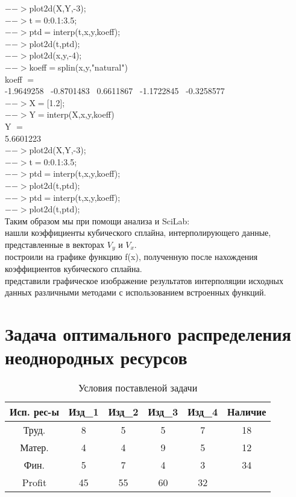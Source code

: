 \documentclass[russian,utf8,nocolumnxxxi,nocolumnxxxii]{eskdtext}
\begin{document}
$-->$plot2d(X,Y,-3);\\
$-->$t$=$0:0.1:3.5;\\
$-->$ptd$=$interp(t,x,y,koeff);\\
$-->$plot2d(t,ptd);\\
$-->$plot2d(x,y,-4);\\
$-->$koeff$=$splin(x,y,"natural")\\
koeff $=$\\
-1.9649258 \ -0.8701483 \ 0.6611867 \ -1.1722845 \ -0.3258577 \\
$-->$X$=$[1.2];\\
$-->$Y$=$interp(X,x,y,koeff)\\
Y $=$\\
5.6601223 \\
$-->$plot2d(X,Y,-3);\\
$-->$t$=$0:0.1:3.5;\\
$-->$ptd$=$interp(t,x,y,koeff);\\
$-->$plot2d(t,ptd);\\
$-->$ptd$=$interp(t,x,y,koeff);\\
$-->$plot2d(t,ptd);\\

Таким образом мы при помощи анализа и SciLab:
\\нашли коэффициенты кубического сплайна, интерполирующего данные, представленные в векторах $V_y$ и $V_x$.
\\построили на графике функцию f(x), полученную после нахождения коэффициентов кубического сплайна.
\\представили графическое изображение результатов интерполяции исходных данных различными методами с использованием встроенных функций.

\newpage
\section{Задача оптимального распределения неоднородных ресурсов}
\begin{table}[h]
\centering
\caption{Условия поставленой задачи}
\begin{tabular}[c]{|*{6}{c|}}
\hline
Исп. рес-ы & Изд\_1 & Изд\_2 & Изд\_3 & Изд\_4 & Наличие\\
\hline
Труд. & 8 & 5 & 5 & 7 & 18\\
\hline
Матер. & 4 & 4 & 9 & 5 & 12\\
\hline
Фин. & 5 & 7 & 4 & 3 & 34\\
\hline
Profit & 45 & 55 & 60 & 32 &  \\
\hline
\end{tabular}
\end{table}
\end{document}
